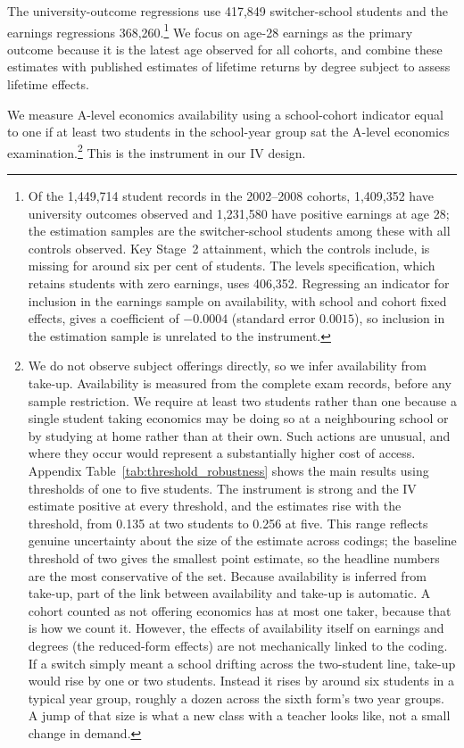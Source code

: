 The university-outcome regressions use 417,849 switcher-school students and the earnings regressions 368,260.\footnote{Of the 1,449,714 student records in the 2002--2008 cohorts, 1,409,352 have university outcomes observed and 1,231,580 have positive earnings at age 28; the estimation samples are the switcher-school students among these with all controls observed. Key Stage~2 attainment, which the controls include, is missing for around six per cent of students. The levels specification, which retains students with zero earnings, uses 406,352. Regressing an indicator for inclusion in the earnings sample on availability, with school and cohort fixed effects, gives a coefficient of $-0.0004$ (standard error $0.0015$), so inclusion in the estimation sample is unrelated to the instrument.} We focus on age-28 earnings as the primary outcome because it is the latest age observed for all cohorts, and combine these estimates with published estimates of lifetime returns by degree subject \citep{britton2026lifetime} to assess lifetime effects.

We measure A-level economics availability using a school-cohort indicator equal to one if at least two students in the school-year group sat the A-level economics examination.\footnote{We do not observe subject offerings directly, so we infer availability from take-up. Availability is measured from the complete exam records, before any sample restriction. We require at least two students rather than one because a single student taking economics may be doing so at a neighbouring school or by studying at home rather than at their own. Such actions are unusual, and where they occur would represent a substantially higher cost of access. Appendix Table~\ref{tab:threshold_robustness} shows the main results using thresholds of one to five students. The instrument is strong and the IV estimate positive at every threshold, and the estimates rise with the threshold, from 0.135 at two students to 0.256 at five. This range reflects genuine uncertainty about the size of the estimate across codings; the baseline threshold of two gives the smallest point estimate, so the headline numbers are the most conservative of the set. Because availability is inferred from take-up, part of the link between availability and take-up is automatic. A cohort counted as not offering economics has at most one taker, because that is how we count it. However, the effects of availability itself on earnings and degrees (the reduced-form effects) are not mechanically linked to the coding. If a switch simply meant a school drifting across the two-student line, take-up would rise by one or two students. Instead it rises by around six students in a typical year group, roughly a dozen across the sixth form's two year groups. A jump of that size is what a new class with a teacher looks like, not a small change in demand.} This is the instrument in our IV design.

